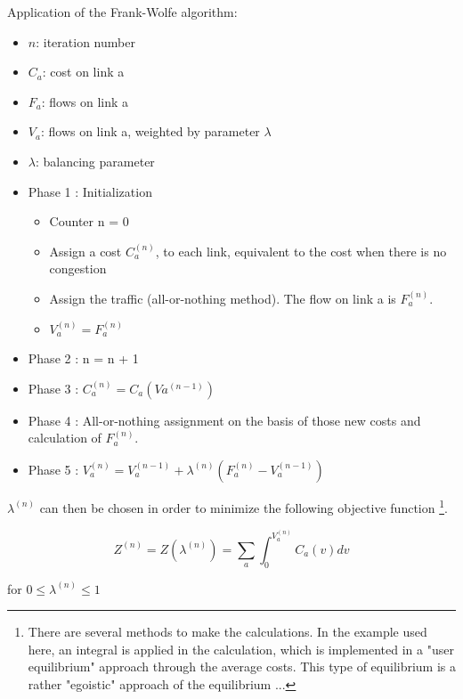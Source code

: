 Application of the Frank-Wolfe algorithm:


\begin{itemize}
\item $n$: iteration number
\item $C_a$: cost on link a
\item $F_a$: flows on link a
\item $V_a$: flows on link a, weighted by parameter $\lambda$
\item $\lambda$: balancing parameter
\end{itemize}

\begin{itemize}
\item Phase 1 : Initialization

\begin{itemize}
\item Counter n = 0
\item Assign a cost $C_a^{(n)}$, to each link, equivalent to the cost when there
is no congestion
\item Assign the traffic (all-or-nothing method). The flow on link a is $F_a^{(n)}$.
\item $V_a^{(n)} = F_a^{(n)}$
\end{itemize}

\item Phase 2 : n = n + 1

\item Phase 3 : $C_a^{(n)} = C_a(Va^{(n-1)})$

\item Phase 4 : All-or-nothing assignment on the basis of those new costs and
calculation of $F_a^{(n)}$.

\item Phase 5 : $V_a^{(n)} = V_a^{(n-1)} + \lambda ^{(n)}(F_a^{(n)} -
V_a^{(n-1)})$
\end{itemize}


$\lambda^{(n)}$ can then be chosen in order to minimize the following objective
function \footnote {There are several methods to make the calculations.  In the
example used here, an integral is applied in the calculation, which
is implemented in a "user equilibrium" approach through the average costs. This
type of equilibrium is a rather "egoistic" approach of the equilibrium ...}.


$$Z^{(n)}=Z(\lambda^{(n)})=\sum_a\int_0^{V_a^{(n)}}C_a(v)dv$$
\begin{center}
for $0\leq \lambda^{(n)} \leq 1$
\end{center}


